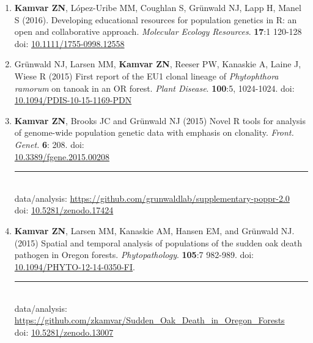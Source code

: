 \begin{enumerate}[leftmargin = 14pt]
	\vspace{3pt}

	\item \textbf{Kamvar ZN}, L\'opez-Uribe MM, Coughlan S, Gr\"unwald NJ, Lapp
	H, Manel S (2016). Developing educational resources for population genetics
	in R: an open and collaborative approach. \textit{Molecular Ecology Resources}.
	\textbf{17}:1 120-128 doi:
	\href{http://doi.org/10.1111/1755-0998.12558}{10.1111/1755-0998.12558}

	\vspace{3pt}

	\item Gr\"unwald NJ, Larsen MM, \textbf{Kamvar ZN}, Reeser PW, Kanaskie A,
	Laine J, Wiese R (2015) First report of the EU1 clonal lineage of
	\textit{Phytophthora ramorum} on tanoak in an OR forest.
	\textit{Plant Disease}. \textbf{100}:5, 1024-1024. doi:
	\href{http://doi.org/10.1094/PDIS-10-15-1169-PDN}{10.1094/PDIS-10-15-1169-PDN}

	\vspace{3pt}

	\item \textbf{Kamvar ZN}, Brooks JC and Gr\"unwald NJ (2015) Novel R tools for
	analysis of genome-wide population genetic data with emphasis on clonality.
	\textit{Front. Genet.} \textbf{6}: 208. doi: \\
	\href{http://doi.org/10.3389/fgene.2015.00208}{10.3389/fgene.2015.00208}\\
	\rule[0.25\baselineskip]{0.25\textwidth}{0.5pt}\\
	data/analysis:
	\href{https://github.com/grunwaldlab/supplementary-poppr-2.0#readme}{https://github.com/grunwaldlab/supplementary-poppr-2.0}\\
	doi:\phantom{t/analysis:}
	\href{https://doi.org/10.5281/zenodo.17424}{10.5281/zenodo.17424}

	\vspace{3pt}

	\item \textbf{Kamvar ZN}, Larsen MM, Kanaskie AM, Hansen EM, and Gr\"unwald
	NJ. (2015) Spatial and temporal analysis of populations of the sudden oak
	death pathogen in Oregon forests. \textit{Phytopathology}. \textbf{105}:7
	982-989. doi:
	\href{http://doi.org/10.1094/PHYTO-12-14-0350-FI}{10.1094/PHYTO-12-14-0350-FI}.\\
	\rule[0.25\baselineskip]{0.25\textwidth}{0.5pt}\\
	data/analysis:
	\href{https://github.com/zkamvar/Sudden_Oak_Death_in_Oregon_Forests#readme}{https://github.com/zkamvar/Sudden\_Oak\_Death\_in\_Oregon\_Forests}\\
	doi:\phantom{t/analysis:}
	\href{https://doi.org/10.5281/zenodo.13007}{10.5281/zenodo.13007}


\end{enumerate}
